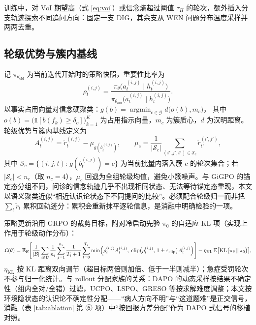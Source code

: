 \documentclass[11pt,a4paper]{ctexart}
\newcommand{\E}{\mathbb{E}}
\newcommand{\1}[1]{\mathbb{1}\!\left[#1\right]}
\newcommand{\Scal}{\mathcal{S}}
\newcommand{\Gcal}{\mathcal{G}}
\newcommand{\Bcal}{\mathcal{B}}
\newcommand{\KL}{\mathrm{KL}}
\newcommand{\VoI}{\mathrm{VoI}}
\begin{document}
训练中，对 $\VoI$ 期望高（式 \eqref{eq:voi}）或信念熵超过阈值 $\tau_H$ 的轮次，额外插入分支轨迹探索不同追问方向：固定一支 DIG，其余支从 WEN 问题分布温度采样并两两去重。

\subsection{轮级优势与簇内基线}
记 $\pi_{\theta_{\mathrm{old}}}$ 为当前迭代开始时的策略快照，重要性比率为
\begin{equation}\label{eq:ratio}
\rho_t^{(i,j)}
=\frac{\pi_\theta\bigl(a_t^{(i,j)}\mid h_t^{(i,j)}\bigr)}
{\pi_{\theta_{\mathrm{old}}}\bigl(a_t^{(i,j)}\mid h_t^{(i,j)}\bigr)}.
\end{equation}
以事实占用向量对信念硬聚类：$g(b)=\operatorname*{argmin}_{c\in\Gcal} d\bigl(o(b),m_c\bigr)$，
其中 $o(b)=\bigl(\1{b(f_k)\ge\delta_o}\bigr)_{k=1}^{K}$ 为占用指示向量，$m_c$ 为簇质心，$d$ 为汉明距离。轮级优势与簇内基线定义为
\begin{equation}\label{eq:advantage}
A_t^{(i,j)}=\tilde r_t^{(i,j)}-\mu_{g\left(b_t^{(i,j)}\right)},
\qquad
\mu_c=\frac{1}{\lvert\Scal_c\rvert}\!\!\sum_{(i',j',t')\in\Scal_c}\!\!\tilde r_{t'}^{(i',j')},
\end{equation}
其中 $\Scal_c=\{(i,j,t):\,g(b_t^{(i,j)})=c\}$ 为当前批量内落入簇 $c$ 的轮次集合；若 $\lvert\Scal_c\rvert<n_c$（取 $n_c=4$），$\mu_c$ 回退为全组轮级均值，避免小簇噪声。与 GiGPO \cite{feng2025gigpo} 的锚定态分组不同，问诊的信念轨迹几乎不出现相同状态、无法等待锚定态重现，本文以语义聚类近似``相近认识论状态下不同提问的比较''。必须配合轮级归一而非把 $\sum_t\tilde r_t$ 累积回轨迹分：累积会重新抹平逐轮信息，是消融中明确检验的一项。

策略更新沿用 GRPO 的裁剪目标，附对冷启动先验 $\pi_0$ 的自适应 KL 项（实现上作用于轮级动作分布）：
\begin{equation}\label{eq:objective}
\mathcal{L}(\theta)=
\E_{\Bcal}\Biggl[\frac{1}{\lvert\Bcal\rvert}\sum_{i\in\Bcal}\frac{1}{n_i}\sum_{j=1}^{n_i}
\frac{1}{T_i+1}\sum_{t=0}^{T_i}
\min\Bigl(\rho_t^{(i,j)} A_t^{(i,j)},\;
\mathrm{clip}\bigl(\rho_t^{(i,j)},\,1\pm\varepsilon_{\mathrm{clip}}\bigr)A_t^{(i,j)}\Bigr)\Biggr]
-\eta_{\mathrm{KL}}\,\E\bigl[\KL\bigl(\pi_\theta\,\|\,\pi_0\bigr)\bigr],
\end{equation}
$\eta_{\mathrm{KL}}$ 按 KL 距离双向调节（超目标两倍则加倍、低于一半则减半）；急症受罚轮次不参与归一化统计。与 rollout 分配家族的关系：DAPO \cite{yu2025dapo} 的动态采样按结果不确定性（组内全对/全错）过滤，UCPO、LSPO、GRESO 等按求解难度调整；本文按环境隐状态的认识论不确定性分配——``病人方向不明''与``这道题难''是正交信号，消融（表 \ref{tab:ablation} 第 ⑥ 项）中``按回报方差分配''作为 DAPO 式信号的移植对照。
\end{document}
